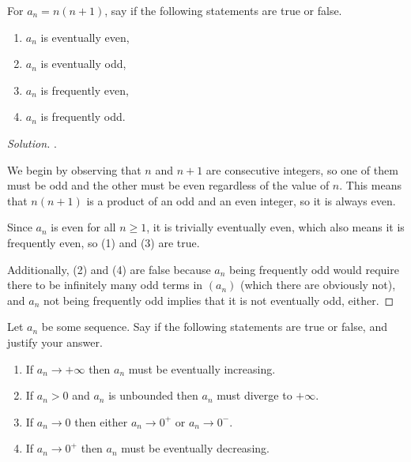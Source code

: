 \documentclass[11pt]{scrartcl}
\providecommand{\ii}{\item}
\theoremstyle{remark}
\newenvironment{problem}[1]
{\renewcommand\theinnercustomthm{\textit{#1}}\innercustomthm}
{\endinnercustomthm}
\newenvironment{soln}{\begin{proof}[Solution]}{\end{proof}}
\begin{document}
	\begin{problem}{2}
		For $a_n = n(n + 1)$, say if the following statements are true or false.
		\begin{enumerate}[(1)]
			\ii $a_n$ is eventually even,
			\ii $a_n$ is eventually odd,
			\ii $a_n$ is frequently even,
			\ii $a_n$ is frequently odd.
		\end{enumerate}
	\end{problem}
	\begin{soln}
		.
		
		We begin by observing that $n$ and $n + 1$ are consecutive integers,
		so one of them must be odd and the other must be even
		regardless of the value of $n$. This means that $n(n + 1)$
		is a product of an odd and an even integer, so it is always even.
		
		Since $a_n$ is even for all $n \ge 1$, it is trivially
		eventually even, which also means it is frequently even, so (1) and (3)
		are true.
		
		Additionally, (2) and (4) are false because $a_n$ being
		frequently odd would require there to be infinitely many odd terms
		in $(a_n)$ (which there are obviously not), and $a_n$
		not being frequently odd implies that it is not eventually odd, either.
	\end{soln}
	\pagebreak
	\begin{problem}{3}
		Let $a_n$ be some sequence.
		Say if the following statements are true or false, and justify your answer.
		\begin{enumerate}[(1)]
			\ii If $a_n\to +\infty$ then $a_n$ must be eventually increasing.
			\ii If $a_n > 0$ and $a_n$ is unbounded then $a_n$ must diverge to
			$+\infty$.
			\ii If $a_n\to 0$ then either $a_n\to 0^+$ or $a_n\to 0^-$.
			\ii If $a_n\to 0^+$ then $a_n$ must be eventually decreasing.
		\end{enumerate}
	\end{problem}
	
\end{document}
